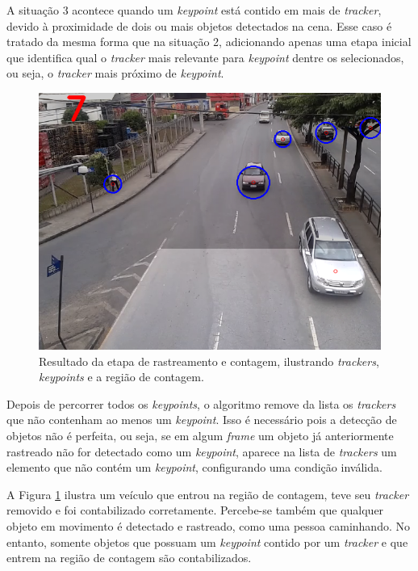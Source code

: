 A situação 3 acontece quando um \textit{keypoint} está contido em mais de \textit{tracker}, devido à proximidade de dois ou mais objetos detectados na cena. Esse caso é tratado da mesma forma que na situação 2, adicionando apenas uma etapa inicial que identifica qual o \textit{tracker} mais relevante para \textit{keypoint} dentre os selecionados, ou seja, o \textit{tracker} mais próximo de \textit{keypoint}.

\begin{figure}[ht]
  \begin{center}
    \includegraphics[scale=0.5]{imgs/trackers.png}
  \end{center}
  \caption{Resultado da etapa de rastreamento e contagem, ilustrando \textit{trackers}, \textit{keypoints} e a região de contagem.}
  \label{fig:trackers}
\end{figure}

Depois de percorrer todos os \textit{keypoints}, o algoritmo remove da lista os \textit{trackers} que não contenham ao menos um \textit{keypoint}. Isso é necessário pois a detecção de objetos não é perfeita, ou seja, se em algum \textit{frame} um objeto já anteriormente rastreado não for detectado como um \textit{keypoint}, aparece na lista de \textit{trackers} um elemento que não contém um \textit{keypoint}, configurando uma condição inválida.

A Figura \ref{fig:trackers} ilustra um veículo que entrou na região de contagem, teve seu \textit{tracker} removido e foi contabilizado corretamente. Percebe-se também que qualquer objeto em movimento é detectado e rastreado, como uma pessoa caminhando. No entanto, somente objetos que possuam um \textit{keypoint} contido por um \textit{tracker} e que entrem na região de contagem são contabilizados.

